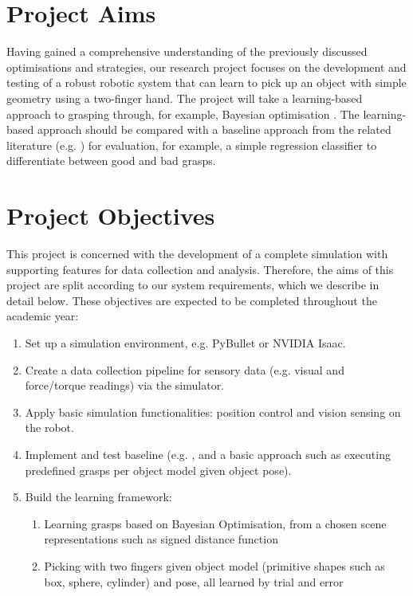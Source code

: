 \documentclass[11pt, a4paper]{report}
\begin{document}
\section{Project Aims}
\label{sec:1.2}
Having gained a comprehensive understanding of the previously discussed optimisations and strategies, our research project focuses on the development and testing of a robust robotic system that can learn to pick up an object with simple geometry using a two-finger hand. The project will take a learning-based approach to grasping through, for example, Bayesian optimisation \cite{nogueira2016unscented, frazier2018tutorial}. The learning-based approach should be compared with a baseline approach from the related literature (e.g. \cite{nogueira2016unscented, danielczuk2020exploratory, breyer2020volumetric}) for evaluation, for example, a simple regression classifier to differentiate between good and bad grasps.


\section{Project Objectives}
\label{sec:1.3}
This project is concerned with the development of a complete simulation with supporting features for data collection and analysis. Therefore, the aims of this project are split according to our system requirements, which we describe in detail below. These objectives are expected to be completed throughout the academic year:
\begin{enumerate}
    \item Set up a simulation environment, e.g. PyBullet \cite{coumans2021} or NVIDIA Isaac. 
    \item Create a data collection pipeline for sensory data (e.g. visual and force/torque readings) via the simulator.
    \item Apply basic simulation functionalities: position control and vision sensing on the robot.
    \item Implement and test baseline (e.g. \cite{breyer2020volumetric}, and a basic approach such as executing predefined grasps per object model given object pose).
    \item Build the learning framework:
    \begin{enumerate}
        \item Learning grasps based on Bayesian Optimisation, from a chosen scene representations such as signed distance function 
        \item Picking with two fingers given object model (primitive shapes such as box, sphere, cylinder) and pose, all learned by trial and error
    \end{enumerate}
\end{enumerate}
\end{document}
